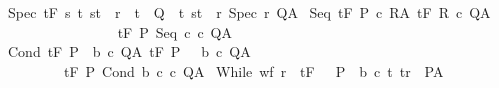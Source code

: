 \begin{isabellebody}
\isanewline
{\isacharbar}\ Spec{\isacharcolon}\ {\isachardoublequoteopen}{\isasymGamma}{\isacharcomma}{\isasymTheta}{\isasymturnstile}\isactrlsub t\isactrlbsub {\isacharslash}F\isactrlesub \ {\isacharbraceleft}s{\isachardot}\ {\isacharparenleft}{\isasymforall}t{\isachardot}\ {\isacharparenleft}s{\isacharcomma}t{\isacharparenright}\ {\isasymin}\ r\ {\isasymlongrightarrow}\ t\ {\isasymin}\ Q{\isacharparenright}\ {\isasymand}\ {\isacharparenleft}{\isasymexists}t{\isachardot}\ {\isacharparenleft}s{\isacharcomma}t{\isacharparenright}\ {\isasymin}\ r{\isacharparenright}{\isacharbraceright}\ {\isacharparenleft}Spec\ r{\isacharparenright}\ Q{\isacharcomma}A{\isachardoublequoteclose}\isanewline
\isanewline
{\isacharbar}\ Seq{\isacharcolon}\ {\isachardoublequoteopen}{\isasymlbrakk}{\isasymGamma}{\isacharcomma}{\isasymTheta}{\isasymturnstile}\isactrlsub t\isactrlbsub {\isacharslash}F\isactrlesub \ P\ c\ R{\isacharcomma}A{\isacharsemicolon}\ {\isasymGamma}{\isacharcomma}{\isasymTheta}{\isasymturnstile}\isactrlsub t\isactrlbsub {\isacharslash}F\isactrlesub \ R\ c\ Q{\isacharcomma}A{\isasymrbrakk}\isanewline
\ \ \ \ \ \ \ \ {\isasymLongrightarrow}\isanewline
\ \ \ \ \ \ \ \ {\isasymGamma}{\isacharcomma}{\isasymTheta}{\isasymturnstile}\isactrlsub t\isactrlbsub {\isacharslash}F\isactrlesub \ P\ Seq\ c\ c\ Q{\isacharcomma}A{\isachardoublequoteclose}\isanewline
\ \ \isanewline
{\isacharbar}\ Cond{\isacharcolon}\ {\isachardoublequoteopen}{\isasymlbrakk}{\isasymGamma}{\isacharcomma}{\isasymTheta}{\isasymturnstile}\isactrlsub t\isactrlbsub {\isacharslash}F\isactrlesub \ {\isacharparenleft}P\ {\isasyminter}\ b{\isacharparenright}\ c\ Q{\isacharcomma}A{\isacharsemicolon}\ {\isasymGamma}{\isacharcomma}{\isasymTheta}{\isasymturnstile}\isactrlsub t\isactrlbsub {\isacharslash}F\isactrlesub \ {\isacharparenleft}P\ {\isasyminter}\ {\isacharminus}\ b{\isacharparenright}\ c\ Q{\isacharcomma}A{\isasymrbrakk}\isanewline
\ \ \ \ \ \ \ \ \ {\isasymLongrightarrow}\ \isanewline
\ \ \ \ \ \ \ \ \ {\isasymGamma}{\isacharcomma}{\isasymTheta}{\isasymturnstile}\isactrlsub t\isactrlbsub {\isacharslash}F\isactrlesub \ P\ {\isacharparenleft}Cond\ b\ c\ c\ Q{\isacharcomma}A{\isachardoublequoteclose}\isanewline
\isanewline
{\isacharbar}\ While{\isacharcolon}\ {\isachardoublequoteopen}{\isasymlbrakk}wf\ r{\isacharsemicolon}\ {\isasymforall}{\isasymsigma}{\isachardot}\ {\isasymGamma}{\isacharcomma}{\isasymTheta}{\isasymturnstile}\isactrlsub t\isactrlbsub {\isacharslash}F\isactrlesub \ {\isacharparenleft}{\isacharbraceleft}{\isasymsigma}{\isacharbraceright}\ {\isasyminter}\ P\ {\isasyminter}\ b{\isacharparenright}\ c\ {\isacharparenleft}{\isacharbraceleft}t{\isachardot}\ {\isacharparenleft}t{\isacharcomma}{\isasymsigma}{\isacharparenright}{\isasymin}r{\isacharbraceright}\ {\isasyminter}\ P{\isacharparenright}{\isacharcomma}A{\isasymrbrakk}\isanewline

\end{isabellebody}
